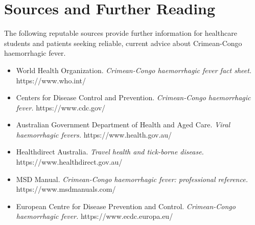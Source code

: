 \section*{Sources and Further Reading}
The following reputable sources provide further information for healthcare students and patients seeking reliable, current advice about Crimean-Congo haemorrhagic fever.

\begin{itemize}
    \item World Health Organization. \textit{Crimean-Congo haemorrhagic fever fact sheet.} https://www.who.int/
    \item Centers for Disease Control and Prevention. \textit{Crimean-Congo haemorrhagic fever.} https://www.cdc.gov/
    \item Australian Government Department of Health and Aged Care. \textit{Viral haemorrhagic fevers.} https://www.health.gov.au/
    \item Healthdirect Australia. \textit{Travel health and tick-borne disease.} https://www.healthdirect.gov.au/
    \item MSD Manual. \textit{Crimean-Congo haemorrhagic fever: professional reference.} https://www.msdmanuals.com/
    \item European Centre for Disease Prevention and Control. \textit{Crimean-Congo haemorrhagic fever.} https://www.ecdc.europa.eu/
\end{itemize}
